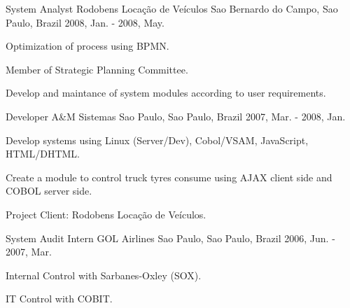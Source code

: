 \begin{cventries}
  \cventry
    {System Analyst} %
    {Rodobens Locação de Veículos} %
    {Sao Bernardo do Campo, Sao Paulo, Brazil} %
    {2008, Jan. - 2008, May.} %
    {
      \begin{cvitems} %
        \item {Optimization of process using BPMN.}
        \item {Member of Strategic Planning Committee.}
        \item {Develop and maintance of system modules according to user requirements.}
      \end{cvitems}
    }

  \cventry
    {Developer} %
    {A\&M Sistemas} %
    {Sao Paulo, Sao Paulo, Brazil} %
    {2007, Mar. - 2008, Jan.} %
    {
      \begin{cvitems} %
        \item {Develop systems using Linux (Server/Dev), Cobol/VSAM, JavaScript, HTML/DHTML.}
        \item {Create a module to control truck tyres consume using AJAX client side and COBOL server side.}
        \item {Project Client: Rodobens Locação de Veículos.}
      \end{cvitems}
    }

  \cventry
    {System Audit Intern} %
    {GOL Airlines} %
    {Sao Paulo, Sao Paulo, Brazil} %
    {2006, Jun. - 2007, Mar.} %
    {
      \begin{cvitems} %
        \item {Internal Control with Sarbanes-Oxley (SOX).}
        \item {IT Control with COBIT.}
      \end{cvitems}
    }


\end{cventries}
